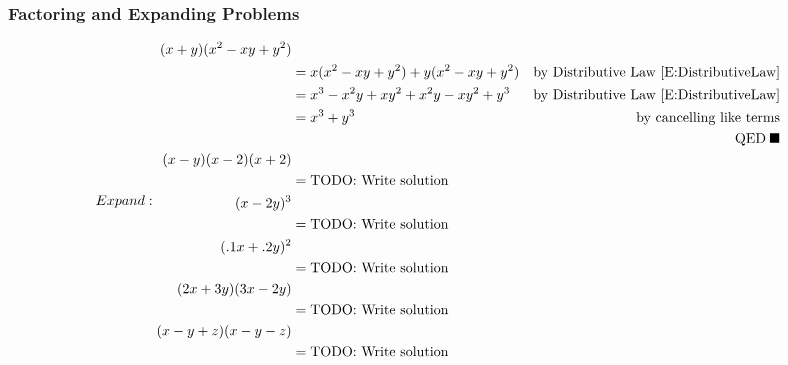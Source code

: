 \documentclass[leqno]{article}
\numberwithin{equation}{section}
\begin{document}
\subsubsection{Factoring and Expanding Problems}
\begin{subequations}
    Expand:
    \begin{align}%
        (x+y)(x^2 - xy + y^2)&\\
        &=x(x^2 - xy + y^2) + y(x^2 - xy + y^2)&\text{by Distributive Law \eqref{E:DistributiveLaw}}\notag\\
        &=x^3 - x^2y + xy^2 + x^2y - xy^2 + y^3&\text{by Distributive Law \eqref{E:DistributiveLaw}}\notag\\
        &=x^3 + y^3&\text{by cancelling like terms}\notag\\
        &\text{}&\text{QED\:}\blacksquare\notag\\
        (x-y)(x-2)(x+2)\\
        &=\text{TODO: Write solution}\notag\\
        (x-2y)^3\\
        &=\text{TODO: Write solution}\notag\\
        (.1x+.2y)^2\\
        &=\text{TODO: Write solution}\notag\\
        (2x+3y)(3x-2y)\\
        &=\text{TODO: Write solution}\notag\\
        (x-y+z)(x-y-z)\\
        &=\text{TODO: Write solution}\notag
    \end{align}
        
\end{subequations}

\newpage
\printbibliography
\end{document}
